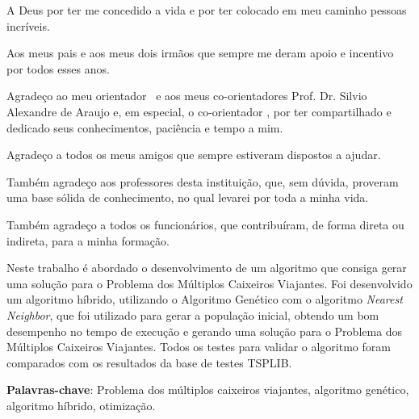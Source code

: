 \documentclass[12pt,openright,a4paper,oneside]{tcc}
\begin{document}

	\imprimircapa
	\imprimirfolhaderosto
	\folhadeaprovacaoteste
    
    \begin{agradecimentos}
        A Deus por ter me concedido a vida e por ter colocado em meu caminho pessoas incríveis.

        Aos meus pais e aos meus dois irmãos que sempre me deram apoio e incentivo por todos esses anos.

        Agradeço ao meu orientador \imprimirorientador~e aos meus co-orientadores Prof. Dr. Silvio Alexandre de Araujo e, em especial, o co-orientador \imprimircoorientador, por ter compartilhado  e dedicado seus conhecimentos, paciência e tempo a mim.

        Agradeço a todos os meus amigos que sempre estiveram dispostos a ajudar.

        Também agradeço aos professores desta instituição, que, sem dúvida, proveram uma base sólida de conhecimento, no qual levarei por toda a minha vida.

        Também agradeço a todos os funcionários, que contribuíram, de forma direta ou indireta, para a minha formação.

    \end{agradecimentos}
    
    \listoffigures*
    \cleardoublepage
	\tableofcontents
   
	\newpage

	\begin{resumo}
        Neste trabalho é abordado o desenvolvimento de um algoritmo que consiga gerar uma solução para o Problema dos Múltiplos Caixeiros Viajantes.
        Foi desenvolvido um algoritmo híbrido, utilizando o Algoritmo Genético com o algoritmo \textit{Nearest Neighbor}, que foi utilizado para gerar a população inicial, obtendo um bom desempenho no tempo de execução e gerando uma solução para o Problema dos Múltiplos Caixeiros Viajantes. Todos os testes para validar o algoritmo foram comparados com os resultados da base de testes TSPLIB.
        
        \vspace{\onelineskip}
        \noindent
        \textbf{Palavras-chave}: Problema dos múltiplos caixeiros viajantes, algoritmo genético,  algoritmo híbrido, otimização.

	\end{resumo}
\end{document}
